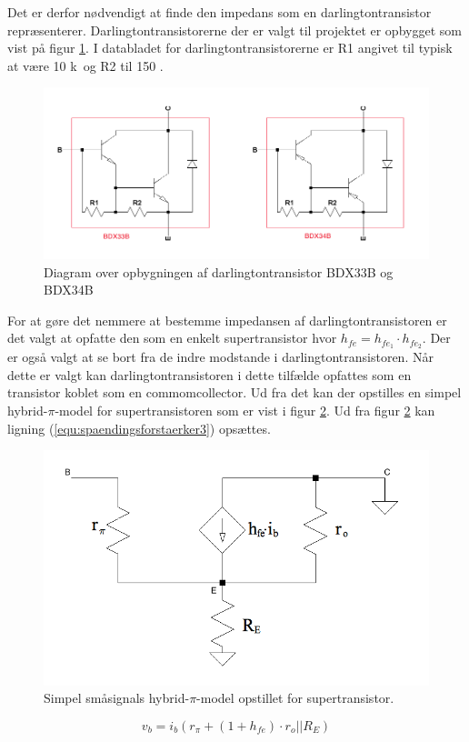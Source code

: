 Det er derfor nødvendigt at finde den impedans som en darlingtontransistor  repræsenterer. Darlingtontransistorerne der er valgt til projektet er opbygget som vist på figur \ref{darlington_diagram}. I databladet for darlingtontransistorerne   er R1 angivet til typisk at være 10 k\ohm~og R2 til 150 \ohm.

\begin{figure}[h]
\centering
\includegraphics[scale = 0.4]{teknisk/effektforstaerker/darlingtontransistor_opbygning.png}
\caption{Diagram over opbygningen af darlingtontransistor BDX33B og BDX34B}
\label{darlington_diagram}
\end{figure}

For at gøre det nemmere at bestemme impedansen af darlingtontransistoren er det valgt at opfatte den som en enkelt supertransistor hvor $h_{fe}= h_{fe_1} \cdot h_{fe_2}$. Der er også valgt at se bort fra de indre modstande i darlingtontransistoren. Når dette er valgt kan darlingtontransistoren i dette tilfælde opfattes som en transistor koblet som en commomcollector. Ud fra det kan der opstilles en simpel hybrid-$\pi$-model for supertransistoren som er vist i figur \ref{hybridpimodel_darlington}. Ud fra figur \ref{hybridpimodel_darlington} kan ligning (\ref{equ:spaendingsforstaerker3}) opsættes.

\begin{figure}[h]
\centering
\includegraphics[scale=0.3]{teknisk/effektforstaerker/hybridpimodel.png}
\caption{Simpel småsignals hybrid-$\pi$-model  opstillet for supertransistor.}
\label{hybridpimodel_darlington}
\end{figure}
\begin{equation}
\label{equ:spaendingsforstaerker3}
v_b = i_b (r_{\pi} + (1+h_{fe}) \cdot r_o||R_E) 
\end{equation}


